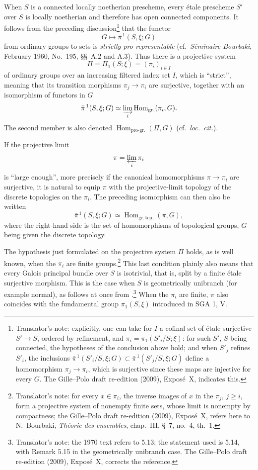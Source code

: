 When \(S\) is a connected locally noetherian prescheme, every étale
prescheme \(S'\) over \(S\) is locally noetherian and therefore has open
connected components. It follows from the preceding
discussion\footnote{Translator's note: explicitly, one can take for \(I\) a
cofinal set of étale surjective \(S'\to S\), ordered by refinement, and
\(\pi_i=\pi_1(S'_i/S;\xi)\): for such \(S'\), \(S\) being connected, the
hypotheses of the conclusion above hold; and when \(S'_j\) refines \(S'_i\),
the inclusions
\(\bar\pi^{\,1}(S'_i/S,\xi;G)\subset\bar\pi^{\,1}(S'_j/S,\xi;G)\) define a
homomorphism \(\pi_j\to\pi_i\), which is surjective since these maps are
injective for every \(G\). The Gille--Polo draft re-edition (2009),
Expos\'e~X, indicates this.} that the functor
\[
  G\longmapsto\bar\pi^{\,1}(S,\xi;G)
\]
from ordinary groups to sets is \emph{strictly pro-representable}
(cf.\ \emph{Séminaire Bourbaki}, February 1960, No.~195,
\S\S~A.2 and A.3). Thus there is a projective system
\[
  \Pi=\Pi_1(S;\xi)=(\pi_i)_{i\in I}
\]
of ordinary groups over an increasing filtered index set \(I\), which is
``strict'', meaning that its transition morphisms
\(\pi_j\to\pi_i\) are surjective, together with an isomorphism of functors
in \(G\)
\[
  \bar\pi^{\,1}(S,\xi;G)
  \simeq
  \varinjlim_i\operatorname{Hom}_{\mathrm{gr.}}(\pi_i,G).
\]
The second member is also denoted
\(\operatorname{Hom}_{\mathrm{pro\text{-}gr.}}(\Pi,G)\)
(cf.\ \emph{loc.\ cit.}).

If the projective limit
\[
  \pi=\varprojlim_i\pi_i
\]
is ``large enough'', more precisely if the canonical homomorphisms
\(\pi\to\pi_i\) are surjective, it is natural to equip \(\pi\) with the
projective-limit topology of the discrete topologies on the \(\pi_i\).
The preceding isomorphism can then also be written
\[
  \bar\pi^{\,1}(S,\xi;G)
  \simeq
  \operatorname{Hom}_{\mathrm{gr.\,top.}}(\pi,G),
\]
where the right-hand side is the set of homomorphisms of topological
groups, \(G\) being given the discrete topology.

The hypothesis just formulated on the projective system \(\Pi\) holds, as
is well known, when the \(\pi_i\) are finite groups.\footnote{Translator's
note: for every \(x\in\pi_i\), the inverse images of \(x\) in the \(\pi_j\),
\(j\geq i\), form a projective system of nonempty finite sets, whose limit is
nonempty by compactness; the Gille--Polo draft re-edition (2009),
Expos\'e~X, refers here to N.~Bourbaki, \emph{Th\'eorie des ensembles},
chap.~III, \S~7, no.~4, th.~1.} This last condition plainly also means
that every Galois principal bundle over \(S\) is isotrivial, that is, split
by a finite étale surjective morphism. This is the case when \(S\) is
geometrically unibranch (for example normal), as follows at once from
.\footnote{Translator's note: the 1970 text refers to 5.13; the
statement used is 5.14, with Remark 5.15 in the geometrically unibranch case.
The Gille--Polo draft re-edition (2009), Expos\'e~X, corrects the
reference.}
When the \(\pi_i\) are finite, \(\pi\) also coincides with the fundamental
group \(\pi_1(S,\xi)\) introduced in SGA 1, V.

